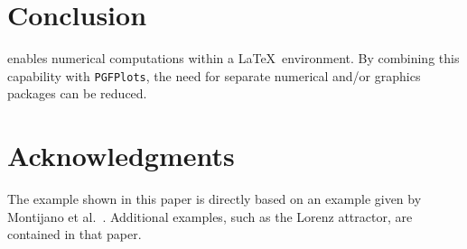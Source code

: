 \documentclass[grid,colorlinks,nofoot]{asmeconf}
\begin{document}

\section{Conclusion}
 enables numerical computations within a \LaTeX\ environment. By combining this capability with
\texttt{PGFPlots}, the need for separate numerical and/or graphics packages can be reduced.


\section*{Acknowledgments}
The example shown in this paper is directly based on an example given by Montijano et al.~\cite{montijano2014}. Additional examples, such as the
Lorenz attractor, are contained in that paper.




\end{document}

